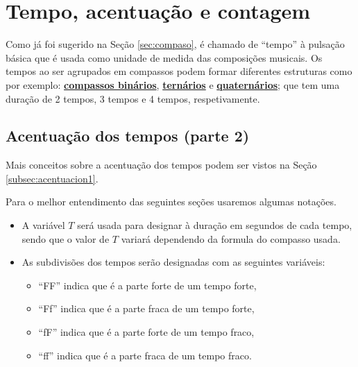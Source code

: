 \section{Tempo, acentuação e contagem}
\label{sec:Tempo}

Como já foi sugerido na Seção \ref{sec:compaso}, é chamado de ``tempo''
à pulsação básica que é usada como unidade de medida das composições musicais.
Os tempos ao ser agrupados em compassos podem formar diferentes estruturas como por exemplo: 
\hyperref[subsec:compassobinario]{\textbf{compassos binários}}, 
\hyperref[subsec:compassoternario]{\textbf{ternários}} e 
\hyperref[subsec:compassoquaternario]{\textbf{quaternários}}; que tem uma duração de 2 tempos, 
3 tempos e 4 tempos, respetivamente. 



\subsection{Acentuação dos tempos (parte 2)}
\label{subsec:acentuacion2}


Mais conceitos sobre a acentuação dos tempos podem ser vistos na Seção \ref{subsec:acentuacion1}.

\begin{notation}[] Para o melhor entendimento das seguintes seções usaremos algumas notações.
\begin{itemize}
\item A variável $T$ será usada para designar à duração em segundos de cada tempo,
sendo que o valor de $T$ variará dependendo da formula do compasso usada.

\item As subdivisões dos tempos serão designadas com as seguintes variáveis:
\begin{itemize}
\item ``FF'' indica que é a parte forte de um tempo forte,
\item ``Ff'' indica que é a parte fraca de um tempo forte,
\item ``fF'' indica que é a parte forte de um tempo fraco,
\item ``ff'' indica que é a parte fraca de um tempo fraco.
\end{itemize}
\end{itemize}

\end{notation}

